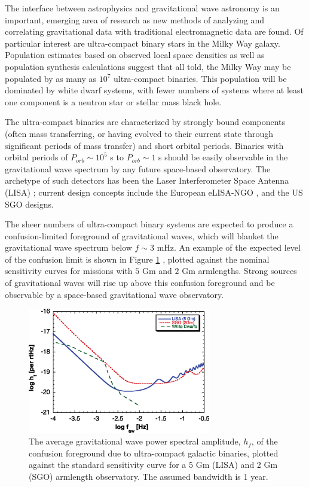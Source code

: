 \documentclass[preprint2]{aastex}
\begin{document}
The interface between astrophysics and gravitational wave astronomy is
an important, emerging area of research as new methods of analyzing
and correlating gravitational data with traditional electromagnetic
data are found.  Of particular interest are ultra-compact binary stars
in the Milky Way galaxy.  Population estimates based on observed local
space densities \citep{HBW,TRC} as well as population synthesis
calculations \citep{Nelemans1,Nelemans2,StarTrack} suggest that all
told, the Milky Way may be populated by as many as $10^{7}$
ultra-compact binaries.  This population will be dominated by white
dwarf systems, with fewer numbers of systems where at least one
component is a neutron star or stellar mass black hole.

The ultra-compact binaries are characterized by strongly bound
components (often mass transferring, or having evolved to their current
state through significant periods of mass transfer) and short orbital
periods.  Binaries with orbital periods of $P_{orb} \sim 10^{5}$ s to
$P_{orb} \sim 1$ s should be easily observable in the gravitational
wave spectrum by any future space-based observatory.  The archetype of
such detectors has been the Laser Interferometer Space Antenna (LISA)
\citep{LPPA}; current design concepts include the European eLISA-NGO
\citep{elisa}, and the US SGO \citep{SGOlow,SGOmid,SGOhi} designs.

The sheer numbers of ultra-compact binary systems are expected to
produce a confusion-limited foreground of gravitational waves, which
will blanket the gravitational wave spectrum below $f \sim 3$ mHz.  An
example of the expected level of the confusion limit is shown in
Figure \ref{fig.wdNoise} \citep{HilsBender}, plotted against the
nominal sensitivity curves \citep{SCG} for missions with $5$ Gm and
$2$ Gm armlengths.  Strong sources of gravitational waves will rise up
above this confusion foreground and be observable by a space-based
gravitational wave observatory.

\begin{figure}[h]
\centering
\includegraphics[width=80mm]{./lisastandard.eps}
  \caption{The average gravitational wave power spectral amplitude,
  $h_{f}$, of the confusion foreground due to ultra-compact galactic
  binaries, plotted against the standard sensitivity curve \citep{SCG}
  for a 5 Gm (LISA) and 2 Gm (SGO) armlength observatory.  The assumed
  bandwidth is 1 year.}
  \label{fig.wdNoise}
\end{figure}
\end{document}
